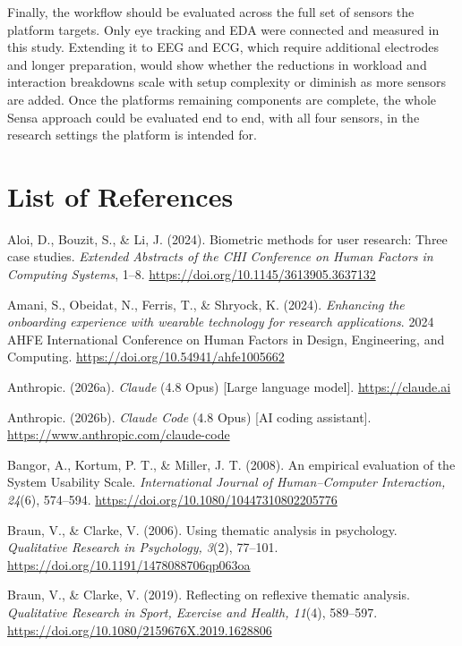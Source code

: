 \documentclass[
]{article}
\begin{document}
Finally, the workflow should be evaluated across the full set of sensors the platform targets. Only eye tracking and EDA were connected and measured in this study. Extending it to EEG and ECG, which require additional electrodes and longer preparation, would show whether the reductions in workload and interaction breakdowns scale with setup complexity or diminish as more sensors are added. Once the platform\textquotesingle s remaining components are complete, the whole Sensa approach could be evaluated end to end, with all four sensors, in the research settings the platform is intended for.


\clearpage
\hypertarget{list-of-references}{%
\section{\texorpdfstring{List of References }{List of References }}\label{list-of-references}}

\begingroup
\setlength{\parindent}{-0.5in}\setlength{\leftskip}{0.5in}\setlength{\parskip}{6pt plus 2pt minus 1pt}

\hspace*{-0.5in}Aloi, D., Bouzit, S., \& Li, J. (2024). Biometric methods for user research: Three case studies. \emph{Extended Abstracts of the CHI Conference on Human Factors in Computing Systems}, 1--8. \url{https://doi.org/10.1145/3613905.3637132}

Amani, S., Obeidat, N., Ferris, T., \& Shryock, K. (2024). \emph{Enhancing the onboarding experience with wearable technology for research applications}. 2024 AHFE International Conference on Human Factors in Design, Engineering, and Computing. \url{https://doi.org/10.54941/ahfe1005662}

Anthropic. (2026a). \emph{Claude} (4.8 Opus) {[}Large language model{]}. \url{https://claude.ai}

Anthropic. (2026b). \emph{Claude Code} (4.8 Opus) {[}AI coding assistant{]}. \url{https://www.anthropic.com/claude-code}

Bangor, A., Kortum, P. T., \& Miller, J. T. (2008). An empirical evaluation of the System Usability Scale. \emph{International Journal of Human--Computer Interaction, 24}(6), 574--594. \url{https://doi.org/10.1080/10447310802205776}

Braun, V., \& Clarke, V. (2006). Using thematic analysis in psychology. \emph{Qualitative Research in Psychology, 3}(2), 77--101. \url{https://doi.org/10.1191/1478088706qp063oa}

Braun, V., \& Clarke, V. (2019). Reflecting on reflexive thematic analysis. \emph{Qualitative Research in Sport, Exercise and Health, 11}(4), 589--597. \url{https://doi.org/10.1080/2159676X.2019.1628806}
\end{document}
